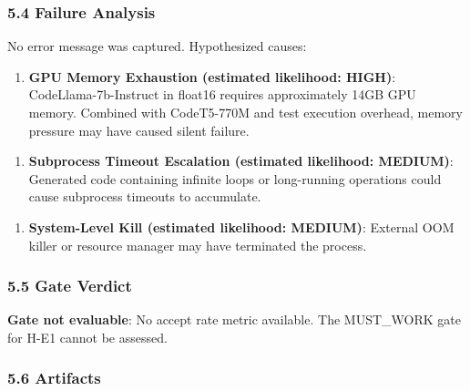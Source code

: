 \subsubsection{5.4 Failure Analysis}

No error message was captured. Hypothesized causes:

\begin{enumerate}
\item \textbf{GPU Memory Exhaustion (estimated likelihood: HIGH)}: CodeLlama-7b-Instruct in float16 requires approximately 14GB GPU memory. Combined with CodeT5-770M and test execution overhead, memory pressure may have caused silent failure.
\end{enumerate}

\begin{enumerate}
\item \textbf{Subprocess Timeout Escalation (estimated likelihood: MEDIUM)}: Generated code containing infinite loops or long-running operations could cause subprocess timeouts to accumulate.
\end{enumerate}

\begin{enumerate}
\item \textbf{System-Level Kill (estimated likelihood: MEDIUM)}: External OOM killer or resource manager may have terminated the process.
\end{enumerate}

\subsubsection{5.5 Gate Verdict}

\textbf{Gate not evaluable}: No accept rate metric available. The MUST\_WORK gate for H-E1 cannot be assessed.

\subsubsection{5.6 Artifacts}

\begin{table}[htbp]
\centering
{}
\end{table}

